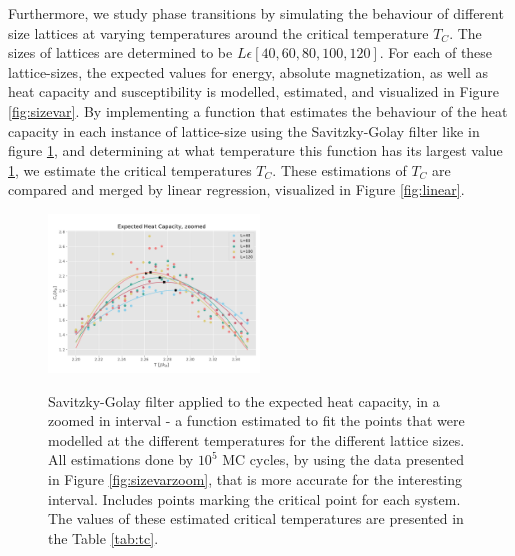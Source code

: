 \documentclass[10pt, nofootinbib, twocolumn]{revtex4-1}
\begin{document}
Furthermore, we study phase transitions by simulating the behaviour of different size lattices at varying temperatures around the critical temperature $T_C$. The sizes of lattices are determined to be $L\epsilon [40, 60, 80, 100, 120]$. For each of these lattice-sizes, the expected values for energy, absolute magnetization, as well as heat capacity and susceptibility is modelled, estimated, and visualized in Figure \ref{fig:sizevar}. By implementing a function that estimates the behaviour of the heat capacity in each instance of lattice-size using the Savitzky-Golay filter like in figure \ref{fig:zoom}, and determining at what temperature this function has its largest value \ref{fig:zoom}, we estimate the critical temperatures $T_C$. These estimations of $T_C$ are compared and merged by linear regression, visualized in Figure \ref{fig:linear}.

\vspace*{2\baselineskip}
\begin{figure}[H]
    \caption{Savitzky-Golay filter applied to the expected heat capacity, in a zoomed in interval - a function estimated to fit the points that were modelled at the different temperatures for the different lattice sizes. All estimations done by $10^5$ MC cycles, by using the data presented in Figure \ref{fig:sizevarzoom}, that is more accurate for the interesting interval. Includes points marking the critical point for each system. The values of these estimated critical temperatures are presented in the Table \ref{tab:tc}.}
    \centering
    \includegraphics[width = 0.5\textwidth]{figures/heat_capacity_zoom.pdf} 
    \label{fig:zoom}
\end{figure} 
\end{document}
